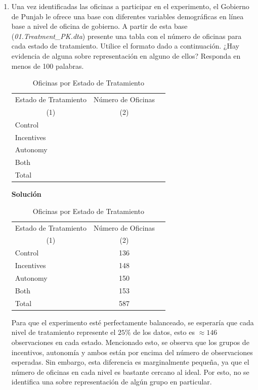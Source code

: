 \documentclass[a4paper, answers, addpoints, 11pt]{exam}
\newenvironment{solucion}{%
  \begin{mdframed}[
    backgroundcolor=blue!5,    %
    linecolor=blue!50,          %
    linewidth=2pt,              %
    leftmargin=10pt,            %
    rightmargin=10pt,           %
    topline=true,              %
    bottomline=true,            %
    roundcorner=10pt,           %
    innerleftmargin=10pt,       %
    innerrightmargin=10pt,      %
    innerbottommargin=10pt,     %
    innertopmargin=10pt         %
  ]%
  \begin{tcolorbox}[colframe=blue!50!black, colback=blue!50, coltitle=white, sharp corners=all, boxrule=1mm, width=\textwidth, halign=left, valign=center, top=0mm, bottom=0mm, left=0mm, right=0mm] \textbf{Solución} \end{tcolorbox} }{\end{mdframed}}
\begin{document}
\begin{enumerate}
    \item Una vez identificadas las oficinas a participar en el experimento, el Gobierno de Punjab le ofrece una base con diferentes variables demográficas en línea base a nivel de oficina de gobierno. A partir de esta base (\textit{01.Treatment\_PK.dta}) presente una tabla con el número de oficinas para cada estado de tratamiento. Utilice el formato dado a continuación. ¿Hay evidencia de alguna sobre representación en alguno de ellos? Responda en menos de 100 palabras.
    \begin{table}[H]
		\centering
			\caption{Oficinas por Estado de Tratamiento}
			\label{tab1:equivalence}
			\begin{tabular}{lcc}
				\toprule
				\multicolumn{1}{c}{Estado de Tratamiento} & \multicolumn{1}{c}{Número de Oficinas}  \\
				\multicolumn{1}{c}{(1)} & 	\multicolumn{1}{c}{(2)} \\ \toprule
				  \addlinespace 
				Control & \\
                Incentives & \\
                Autonomy & \\
                Both & \\ \midrule
                Total & \\ \bottomrule
			\end{tabular}	
	\end{table}
\begin{solucion}
 \begin{table}[H]
		\centering
			\caption{Oficinas por Estado de Tratamiento}
			\label{tab1:equivalence}
			\begin{tabular}{lcc}
				\toprule
				\multicolumn{1}{c}{Estado de Tratamiento} & \multicolumn{1}{c}{Número de Oficinas}  \\
				\multicolumn{1}{c}{(1)} & 	\multicolumn{1}{c}{(2)} \\ \toprule
				  \addlinespace 
				Control & 136\\
                Incentives & 148 \\
                Autonomy & 150\\
                Both & 153\\ \midrule
                Total &  587\\ \bottomrule
			\end{tabular}	
	\end{table}

    Para que el experimento esté perfectamente balanceado, se esperaría que cada nivel de tratamiento represente el $25\%$ de los datos, esto es $\approx 146$ observaciones en cada estado. Mencionado esto, se observa que los grupos de incentivos, autonomía y ambos están por encima del número de observaciones esperadas. Sin embargo, esta diferencia es marginalmente pequeña, ya que el número de oficinas en cada nivel es bastante cercano al ideal. Por esto, no se identifica una sobre representación de algún grupo en particular.
    

\end{solucion}
\end{enumerate}
\end{document}
